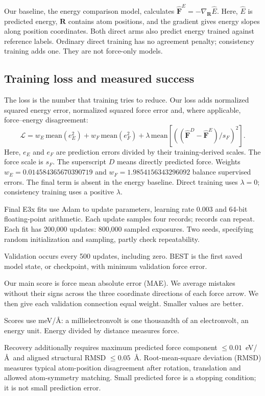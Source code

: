 \documentclass{article}
\begin{document}
Our baseline, the energy comparison model, calculates $\widehat{\mathbf F}^{E}=-\nabla_{\mathbf R}\widehat E$. Here, $\widehat E$ is predicted energy, $\mathbf R$ contains atom positions, and the gradient gives energy slopes along position coordinates. Both direct arms also predict energy trained against reference labels. Ordinary direct training has no agreement penalty; consistency training adds one. They are not force-only models.
\subsection{Training loss and measured success}
The loss is the number that training tries to reduce. Our loss adds normalized squared energy error, normalized squared force error and, where applicable, force--energy disagreement:
\begin{equation}
\mathcal L=w_E\,\mathrm{mean}(e_E^2)+w_F\,\mathrm{mean}(e_F^2)
+\lambda\,\mathrm{mean}\!\left[\left((\widehat{\mathbf F}^{D}-\widehat{\mathbf F}^{E})/s_F\right)^2\right].
\end{equation}
Here, $e_E$ and $e_F$ are prediction errors divided by their training-derived scales. The force scale is $s_F$. The superscript $D$ means directly predicted force. Weights $w_E=0.014584365670390719$ and $w_F=1.9854156343296092$ balance supervised errors. The final term is absent in the energy baseline. Direct training uses $\lambda=0$; consistency training uses a positive $\lambda$.

Final E3x fits use Adam to update parameters, learning rate 0.003 and 64-bit floating-point arithmetic. Each update samples four records; records can repeat. Each fit has 200,000 updates: 800,000 sampled exposures. Two seeds, specifying random initialization and sampling, partly check repeatability.

Validation occurs every 500 updates, including zero. BEST is the first saved model state, or checkpoint, with minimum validation force error.

Our main score is force mean absolute error (MAE). We average mistakes without their signs across the three coordinate directions of each force arrow. We then give each validation connection equal weight. Smaller values are better.

Scores use meV/\AA: a millielectronvolt is one thousandth of an electronvolt, an energy unit. Energy divided by distance measures force.

Recovery additionally requires maximum predicted force component $\leq0.01$~eV/\AA\ and aligned structural RMSD $\leq0.05$~\AA. Root-mean-square deviation (RMSD) measures typical atom-position disagreement after rotation, translation and allowed atom-symmetry matching. Small predicted force is a stopping condition; it is not small prediction error.
\end{document}
